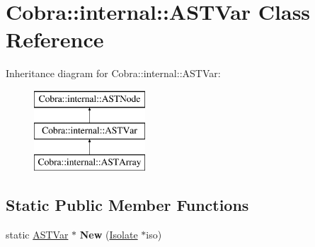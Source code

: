 \hypertarget{class_cobra_1_1internal_1_1_a_s_t_var}{\section{Cobra\+:\+:internal\+:\+:A\+S\+T\+Var Class Reference}
\label{class_cobra_1_1internal_1_1_a_s_t_var}
}
Inheritance diagram for Cobra\+:\+:internal\+:\+:A\+S\+T\+Var\+:\begin{figure}[H]
\begin{center}
\leavevmode
\includegraphics[height=3.000000cm]{class_cobra_1_1internal_1_1_a_s_t_var}
\end{center}
\end{figure}
\subsection*{Static Public Member Functions}
\begin{DoxyCompactItemize}
\item 
\hypertarget{class_cobra_1_1internal_1_1_a_s_t_var_a4c07624d80e9e80ff4a3311a3c47de54}{static \hyperlink{class_cobra_1_1internal_1_1_a_s_t_var}{A\+S\+T\+Var} $\ast$ {\bfseries New} (\hyperlink{class_cobra_1_1internal_1_1_isolate}{Isolate} $\ast$iso)}\label{class_cobra_1_1internal_1_1_a_s_t_var_a4c07624d80e9e80ff4a3311a3c47de54}

\end{DoxyCompactItemize}
